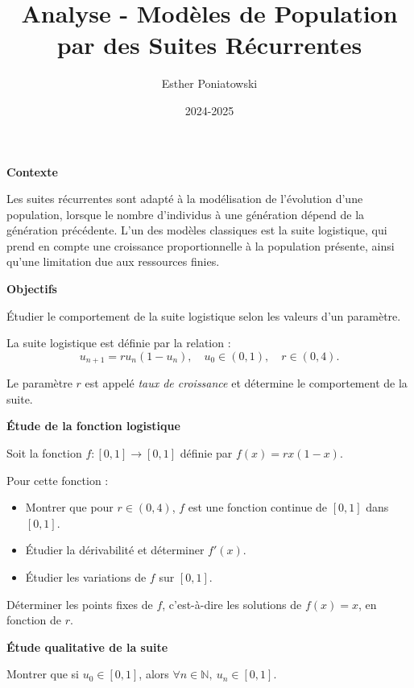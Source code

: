 \documentclass[10pt,a4paper]{article}
\title{Analyse - Modèles de Population par des Suites Récurrentes}
\author{Esther Poniatowski}
\date{2024-2025}
\begin{document}
\textbf{Contexte}

Les suites récurrentes sont adapté à  la modélisation de l'évolution d'une population, lorsque le
nombre d'individus à une génération dépend de la génération précédente. L'un des modèles classiques
est la suite logistique, qui prend en compte une croissance proportionnelle à la population
présente, ainsi qu'une limitation due aux ressources finies.

\bigskip
\textbf{Objectifs}

Étudier le comportement de la suite logistique selon les valeurs d'un paramètre.

La suite logistique est définie par la relation :
\[
u_{n+1} = r u_n (1 - u_n), \quad u_0 \in (0,1), \quad r \in (0,4).
\]

Le paramètre \( r \) est appelé \emph{taux de croissance} et détermine le comportement de la suite.

\vspace{0.5cm}
\textbf{Étude de la fonction logistique}

Soit la fonction \( f : [0,1] \to [0,1] \) définie par \( f(x) = r x (1 - x) \).

\q Pour cette fonction :
\begin{itemize}
    \item Montrer que pour \( r \in (0,4) \), \( f \) est une fonction continue de \( [0,1] \) dans
    \( [0,1] \).
    \item Étudier la dérivabilité et déterminer \( f'(x) \).
    \item Étudier les variations de \( f \) sur \( [0,1] \).
\end{itemize}

\q Déterminer les points fixes de \( f \), c'est-à-dire les solutions de \( f(x) = x \), en fonction
de \( r \).

\vspace{0.5cm}
\textbf{Étude qualitative de la suite}

\q %
Montrer que si \( u_0 \in [0,1] \), alors \( \forall n \in \mathbb{N},\ u_n \in [0,1] \).
\end{document}
